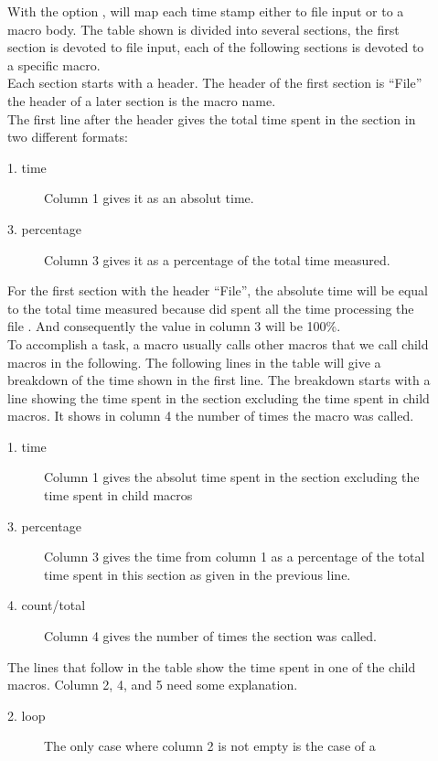 \documentclass[a4paper,english]{article}
\begin{document}
\begin{description}
\item[  ]
  With the option ,  will map each time stamp
  either to file input or to a macro body.
  The table shown is divided into several sections, the first section
  is devoted to file input, each of the following sections is devoted
  to a specific macro.  
  \\
  Each section starts with a header. The header of the
  first section is ``File'' the header of a later section is the macro name.
  \\
  The first line after the header gives the total time spent in the section
  in two different formats:
  \begin{description}
    \item[1. time]
      Column 1 gives it as an absolut time.
    \item[3. percentage]
      Column 3 gives it as a percentage of the total time measured.
  \end{description}
  For the first section with the header ``File'', the absolute time
  will be equal to the total time measured because 
  did spent all the time processing the file .
  And consequently the value in column 3 will be 100\%.
  \\
  To accomplish a task, a macro usually calls other
  macros that we call child macros in the following.
  The following lines in the table will give a breakdown
  of the time shown in the first line.
  The breakdown starts with a line showing the time spent in the section
  excluding the time spent in child macros. It shows in column 4 the number
  of times the macro was called.
  \begin{description}
    \item[1. time]
      Column 1 gives the absolut time spent in the section excluding the time
      spent in child macros
    \item[3. percentage]
      Column 3 gives the time from column 1 as a percentage of the total time
      spent in this section as given in the previous line.
    \item[4. count/total]
      Column 4 gives the number of times the section was called.
  \end{description}
  The lines that follow in the table show the time spent in one of
  the child macros. Column 2, 4, and 5 need some explanation.
    \begin{description}
    \item[2. loop]
      The only case where column 2 is not empty is the case of a

\end{description}
\end{description}
\end{document}
